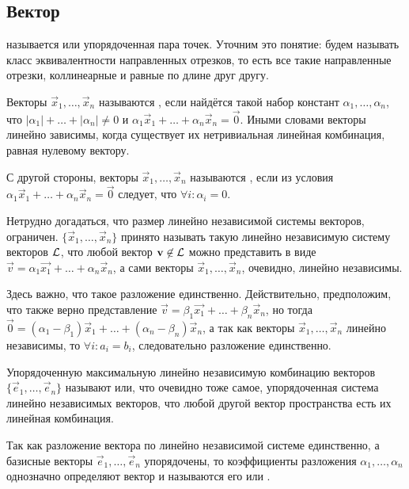 \subsection{Вектор}
 называется  или упорядоченная пара точек. Уточним это понятие:  будем называть класс эквивалентности направленных отрезков, то есть все такие направленные отрезки, коллинеарные и равные по длине друг другу.

    Векторы $\vec{x}_1, \ldots, \vec{x}_n$ называются , если найдётся такой набор констант $\alpha_1, \ldots, \alpha_n$, что $|\alpha_1| + \ldots + |\alpha_n| \not= 0$ и $\alpha_1 \vec{x}_1 + \ldots + \alpha_n \vec{x}_n = \vec{0}$. Иными словами векторы линейно зависимы, когда существует их нетривиальная линейная комбинация, равная нулевому вектору.

    С другой стороны, векторы $\vec{x}_1, \ldots, \vec{x}_n$ называются , если из условия $\alpha_1 \vec{x}_1 + \ldots + \alpha_n \vec{x}_n = \vec{0}$ следует, что $\forall i : \alpha_i = 0$.

    Нетрудно догадаться, что размер линейно независимой системы векторов, ограничен.  $\{\vec{x}_1, \ldots, \vec{x}_n\}$ принято называть такую линейно независимую систему векторов $\mathcal{L}$, что любой вектор $\mathbf{v} \not\in \mathcal{L}$ можно представить в виде $\vec{v} = \alpha_1 \vec{x_1} + \ldots + \alpha_n \vec{x}_n$, а сами векторы $\vec{x}_1, \ldots, \vec{x}_n$, очевидно, линейно независимы.

    Здесь важно, что такое разложение единственно. Действительно, предположим, что также верно представление $\vec{v} = \beta_1 \vec{x_1} + \ldots + \beta_n \vec{x}_n$, но тогда $\vec{0} = (\alpha_1 - \beta_1) \vec{x}_1 + \ldots + (\alpha_n - \beta_n) \vec{x}_n$, а так как векторы $\vec{x}_1, \ldots, \vec{x}_n$ линейно независимы, то $\forall i: a_i = b_i$, следовательно разложение единственно.

    Упорядоченную максимальную линейно независимую комбинацию векторов $\{\vec{e}_1, \ldots, \vec{e}_n \}$ называют  или, что очевидно тоже самое, упорядоченная система линейно независимых векторов, что любой другой вектор пространства есть их линейная комбинация.

    Так как разложение вектора по линейно независимой системе единственно, а базисные векторы $\vec{e}_1, \ldots, \vec{e}_n$ упорядочены, то коэффициенты разложения $\alpha_1, \ldots, \alpha_n$ однозначно определяют вектор и называются его  или .

